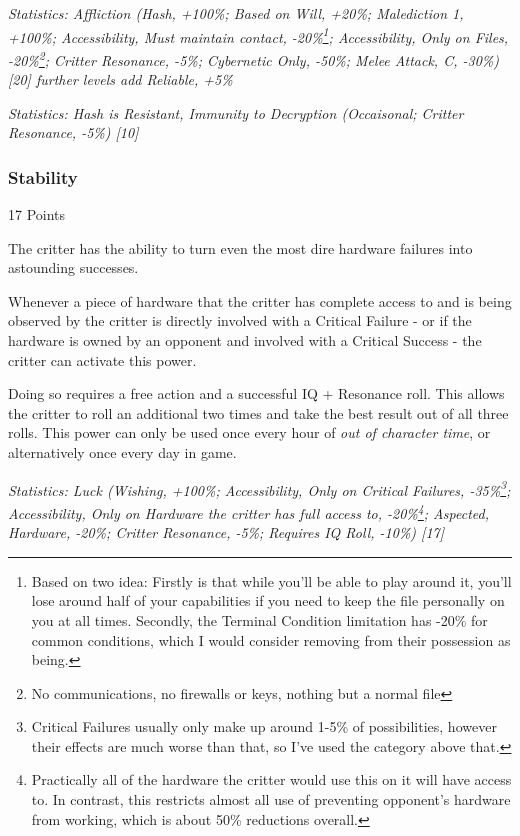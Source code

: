 \begin{multicols*}{3}
	\textcolor{OliveGreen}{\textit{Statistics: Affliction (Hash, +100\%; Based on Will, +20\%; Malediction 1, +100\%; Accessibility, Must maintain contact, -20\%\footnote{Based on two idea: Firstly is that while you'll be able to play around it, you'll lose around half of your capabilities if you need to keep the file personally on you at all times. Secondly, the Terminal Condition limitation has -20\% for common conditions, which I would consider removing from their possession as being.}; Accessibility, Only on Files, -20\%\footnote{No communications, no firewalls or keys, nothing but a normal file}; Critter Resonance, -5\%; Cybernetic Only, -50\%; Melee Attack, C, -30\%) [20] further levels add Reliable, +5\%}}

	\textcolor{OliveGreen}{\textit{Statistics: Hash is Resistant, Immunity to Decryption (Occaisonal; Critter Resonance, -5\%) [10]}}

	\subsubsection{Stability}\label{stability}
	\begin{flushright}
		17 Points
	\end{flushright}

	The critter has the ability to turn even the most dire hardware failures into astounding successes.
	
	Whenever a piece of hardware that the critter has complete access to and is being observed by the critter is directly involved with a Critical Failure - or if the hardware is owned by an opponent and involved with a Critical Success - the critter can activate this power.
	
	Doing so requires a free action and a successful IQ + Resonance roll. This allows the critter to roll an additional two times and take the best result out of all three rolls. This power can only be used once every hour of \textit{out of character time}, or alternatively once every day in game.

	\textcolor{OliveGreen}{\textit{Statistics: Luck (Wishing, +100\%; Accessibility, Only on Critical Failures, -35\%\footnote{Critical Failures usually only make up around 1-5\% of possibilities, however their effects are much worse than that, so I've used the category above that.}; Accessibility, Only on Hardware the critter has full access to, -20\%\footnote{Practically all of the hardware the critter would use this on it will have access to. In contrast, this restricts almost all use of preventing opponent's hardware from working, which is about 50\% reductions overall.}; Aspected, Hardware, -20\%; Critter Resonance, -5\%; Requires IQ Roll, -10\%) [17] }}


\end{multicols*}
